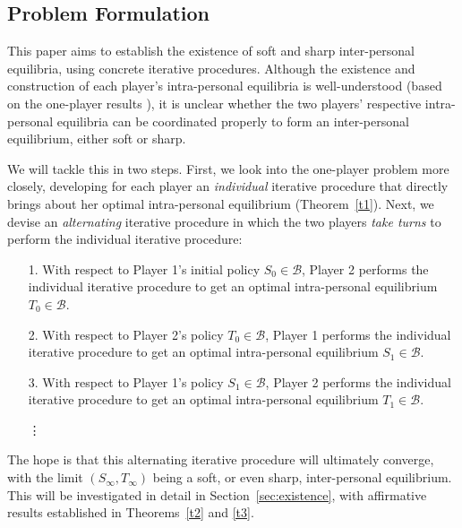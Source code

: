 \documentclass[11pt,reqno]{article}
\numberwithin{equation}{section}
\newcommand{\B}{\mathcal{B}}
\begin{document}
\subsection{Problem Formulation}\label{subsec:problem}
This paper aims to establish the {existence} of soft and sharp inter-personal equilibria, using concrete iterative procedures.
Although the existence and construction of each player's intra-personal equilibria is well-understood (based on the one-player results  \cite{HN18, HZ19}), it is unclear whether the two players' respective intra-personal equilibria can be coordinated properly to form an inter-personal equilibrium, either soft or sharp. 


We will tackle this in two steps. First, we look into the one-player problem more closely, developing for each player an {\it individual} {iterative procedure} that directly brings about her optimal intra-personal equilibrium (Theorem~\ref{t1}). %
Next, we devise an {\it alternating} iterative procedure in which the two players {\it take turns} to perform the individual iterative procedure:
\begin{itemize}
\item [1.] With respect to Player 1's initial policy $S_0\in\B$, Player 2 performs the individual iterative procedure to get an optimal intra-personal equilibrium $T_0\in\B$.
\item [2.] With respect to Player 2's policy $T_0\in\B$, Player 1 performs the individual iterative procedure to get an optimal intra-personal equilibrium $S_1\in\B$.
\item [3.] With respect to Player 1's policy $S_1\in\B$, Player 2 performs the individual iterative procedure to get an optimal intra-personal equilibrium $T_1\in\B$.
\item [\vdots]
\end{itemize}
The hope is that this alternating iterative procedure will ultimately converge, with the limit $(S_\infty, T_\infty)$ being a soft, or even sharp, inter-personal equilibrium. This will be investigated in detail in Section~\ref{sec:existence}, with affirmative results established in Theorems~\ref{t2} and \ref{t3}. 
\end{document}
